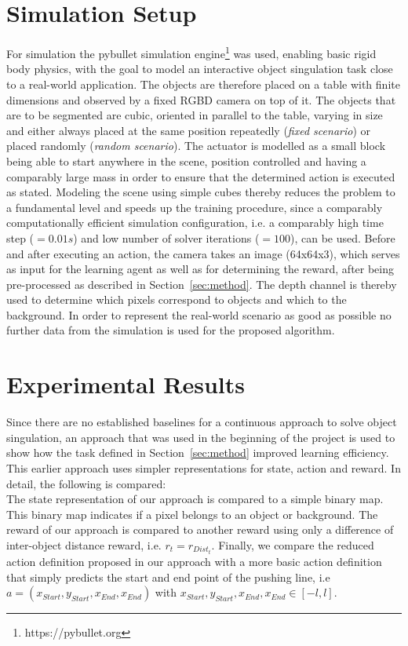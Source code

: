 \documentclass{article}
\newcommand{\mysecref}[1]{Section~\ref{#1}}
\begin{document}
\section{Simulation Setup}
\label{sec:simulation}
For simulation the pybullet simulation engine\footnote{https://pybullet.org} was used, enabling basic rigid body physics, with the goal to model an interactive object singulation task close to a real-world application. The objects are therefore placed on a table with finite dimensions and observed by a fixed RGBD camera on top of it. The objects that are to be segmented are cubic, oriented in parallel to the table, varying in size and either always placed at the same position repeatedly (\textit{fixed scenario}) or placed randomly (\textit{random scenario}). The actuator is modelled as a small block being able to start anywhere in the scene, position controlled and having a comparably large mass in order to ensure that the determined action is executed as stated. Modeling the scene using simple cubes thereby reduces the problem to a fundamental level and speeds up the training procedure, since a comparably computationally efficient simulation configuration, i.e. a comparably high time step ($= 0.01 s$) and low number of solver iterations ($= 100$), can be used. Before and after executing an action, the camera takes an image (64x64x3), which serves as input for the learning agent as well as for determining the reward, after being pre-processed as described in \mysecref{sec:method}. The depth channel is thereby used to determine which pixels correspond to objects and which to the background. In order to represent the real-world scenario as good as possible no further data from the simulation is used for the proposed algorithm. 

\section{Experimental Results}
\label{sec:result}

Since there are no established baselines for a continuous approach to solve object singulation, an approach that was used in the beginning of the project is used to show how the task defined in \mysecref{sec:method} improved learning efficiency. This earlier approach uses simpler representations for state, action and reward. In detail, the following is compared: \\
The state representation of our approach is compared to a simple binary map. This binary map indicates if a pixel belongs to an object or background.
The reward of our approach is compared to another reward using only a difference of inter-object distance reward, i.e. $r_t=r_{Dist_t}$. Finally, we compare the reduced action definition proposed in our approach with a more basic action definition that simply predicts the start and end point of the pushing line, i.e  $ a = (x_{Start},y_{Start},x_{End},x_{End})$ with $ x_{Start},y_{Start},x_{End},x_{End}  \in [-l,l]$.
\end{document}

